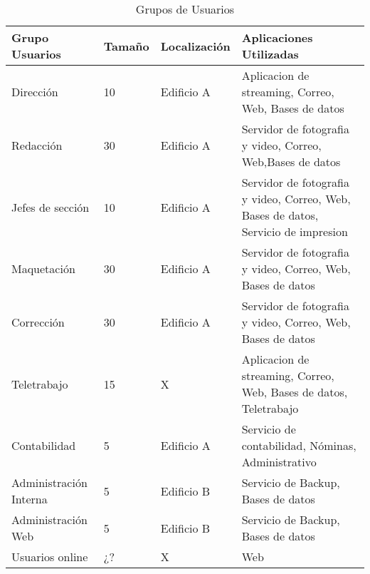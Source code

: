 \documentclass[a4paper,onecolumn,11pt]{article}
\begin{document}
\begin{table}[htbp]
\small \sffamily
\caption{Grupos de Usuarios}
\begin{center}
\begin{tabular}{p{}p{}p{}p{}}
\toprule
\textbf{Grupo Usuarios} & \textbf{Tamaño} & \textbf{Localización} & \textbf{Aplicaciones Utilizadas}\\
\toprule
Dirección & 10& Edificio A & Aplicacion de streaming, Correo, Web, Bases de datos \\ \midrule
Redacción  &  30 & Edificio A & Servidor de fotografia y video, Correo, Web,Bases de datos \\ \midrule
Jefes de sección &  10 & Edificio A  & Servidor de fotografia y video, Correo, Web, Bases de datos, Servicio de impresion \\ \midrule
Maquetación  &  30& Edificio A  & Servidor de fotografia y video, Correo, Web, Bases de datos \\ \midrule
Corrección &  30 & Edificio A  & Servidor de fotografia y video, Correo, Web, Bases de datos \\ \midrule
Teletrabajo & 15 & X & Aplicacion de streaming, Correo, Web, Bases de datos, Teletrabajo \\ \midrule
Contabilidad & 5 & Edificio A & Servicio de contabilidad, Nóminas, Administrativo \\ \midrule
Administración Interna & 5 & Edificio B & Servicio de Backup, Bases de datos \\ \midrule
Administración Web& 5 & Edificio B & Servicio de Backup, Bases de datos\\ \midrule
Usuarios online & ¿? & X & Web \\
\bottomrule
\end{tabular}
\end{center}
\label{tab:gruposUsuarios}
\end{table}
\end{document}

